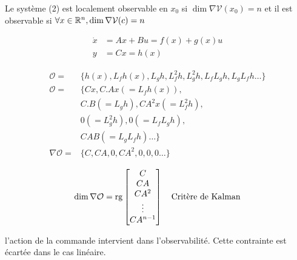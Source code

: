 \documentclass[main.tex]{subfiles}
\begin{document}
\begin{thm}
Le système (2) est localement observable en $x_0$ si $\dim \nabla \mathcal{V}(x_0) = n$ et il est observable si $\forall x \in \mathbb{R}^n, \dim \nabla \mathcal{V}(c) = n$
\end{thm}

\begin{exemple}
\begin{align*}
\dot{x} & = Ax + Bu = f(x) + g(x)u\\
y & = Cx = h(x)
\end{align*}

\begin{align*} 
  \mathcal{O}      =  &\{ h(x), L_fh(x), L_gh,
                       L^2_fh ,L_g^2h , L_fL_gh ,
                       L_gL_fh \dots \}                        \\
\mathcal{O}         = &\{ Cx, C.Ax (=L_fh(x)),                 \\
                      & C.B (=L_gh), CA^2x (=L^2_fh),             \\
                      & 0 (=L_g^2h) , 0 (=L_fL_gh) ,              \\
                      & CAB (=L_gL_fh) \dots \}                   \\
  \nabla \mathcal{O}     = &\{ C , CA , 0 ,CA^2 , 0 , 0 , 0 \dots \} \\
\end{align*}
\[
\dim \nabla \mathcal{O}  = {\rm rg} \begin{bmatrix}  C \\ CA \\ CA^2 \\ \vdots \\ CA^{n-1} \end{bmatrix} \quad \text{Critère de Kalman}
\]
\end{exemple}

\begin{rem}
l'action de la commande intervient dans l'observabilité. Cette contrainte est écartée dans le cas linéaire.
\end{rem}
\end{document}
